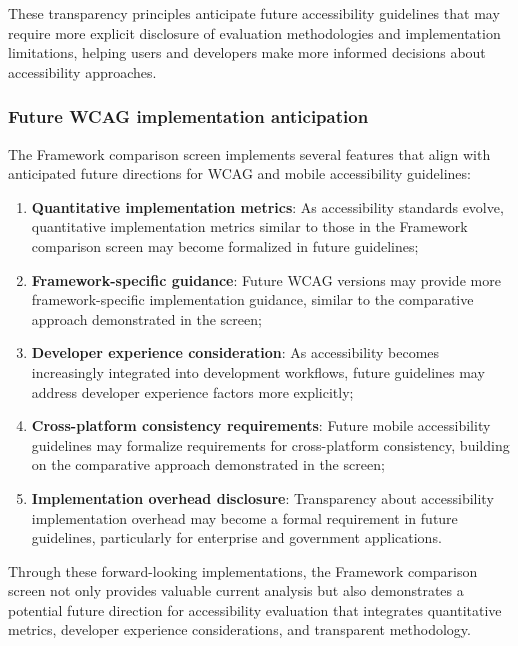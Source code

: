 These transparency principles anticipate future accessibility guidelines that may require more explicit disclosure of evaluation methodologies and implementation limitations, helping users and developers make more informed decisions about accessibility approaches.

\subsubsection{Future WCAG implementation anticipation}
\label{subsubsec:future-wcag-anticipation}

The Framework comparison screen implements several features that align with anticipated future directions for WCAG and mobile accessibility guidelines:

\begin{enumerate}
    \item \textbf{Quantitative implementation metrics}: As accessibility standards evolve, quantitative implementation metrics similar to those in the Framework comparison screen may become formalized in future guidelines;
    
    \item \textbf{Framework-specific guidance}: Future WCAG versions may provide more framework-specific implementation guidance, similar to the comparative approach demonstrated in the screen;
    
    \item \textbf{Developer experience consideration}: As accessibility becomes increasingly integrated into development workflows, future guidelines may address developer experience factors more explicitly;
    
    \item \textbf{Cross-platform consistency requirements}: Future mobile accessibility guidelines may formalize requirements for cross-platform consistency, building on the comparative approach demonstrated in the screen;
    
    \item \textbf{Implementation overhead disclosure}: Transparency about accessibility implementation overhead may become a formal requirement in future guidelines, particularly for enterprise and government applications.
\end{enumerate}

Through these forward-looking implementations, the Framework comparison screen not only provides valuable current analysis but also demonstrates a potential future direction for accessibility evaluation that integrates quantitative metrics, developer experience considerations, and transparent methodology.

